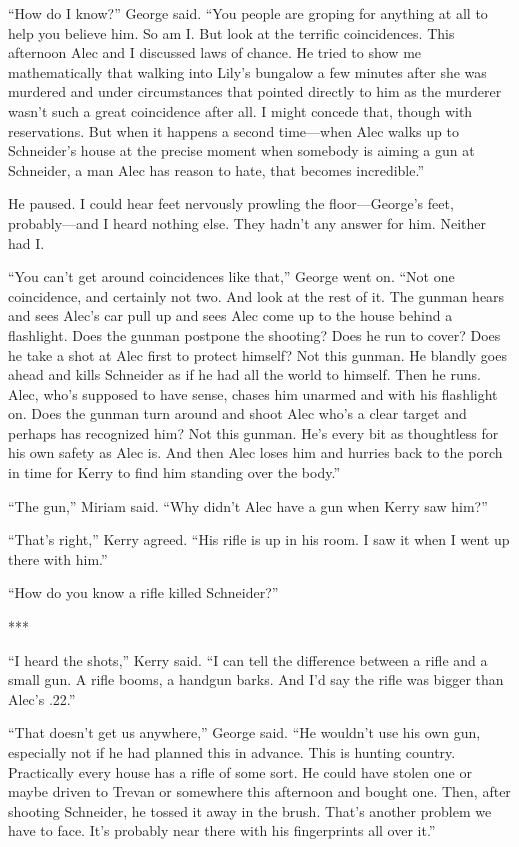 \documentclass{novel}
\begin{document}
“How do I know?” George said. “You people are groping for anything at all to help you believe him. So am I. But look at the terrific coincidences. This afternoon Alec and I discussed laws of chance. He tried to show me mathematically that walking into Lily’s bungalow a few minutes after she was murdered and under circumstances that pointed directly to him as the murderer wasn’t such a great coincidence after all. I might concede that, though with reservations. But when it happens a second time—when Alec walks up to Schneider’s house at the precise moment when somebody is aiming a gun at Schneider, a man Alec has reason to hate, that becomes incredible.”

He paused. I could hear feet nervously prowling the floor—George’s feet, probably—and I heard nothing else. They hadn’t any answer for him. Neither had I.

“You can’t get around coincidences like that,” George went on. “Not one coincidence, and certainly not two. And look at the rest of it. The gunman hears and sees Alec’s car pull up and sees Alec come up to the house behind a flashlight. Does the gunman postpone the shooting? Does he run to cover? Does he take a shot at Alec first to protect himself? Not this gunman. He blandly goes ahead and kills Schneider as if he had all the world to himself. Then he runs. Alec, who’s supposed to have sense, chases him unarmed and with his flashlight on. Does the gunman turn around and shoot Alec who’s a clear target and perhaps has recognized him? Not this gunman. He’s every bit as thoughtless for his own safety as Alec is. And then Alec loses him and hurries back to the porch in time for Kerry to find him standing over the body.”

“The gun,” Miriam said. “Why didn’t Alec have a gun when Kerry saw him?”

“That’s right,” Kerry agreed. “His rifle is up in his room. I saw it when I went up there with him.”

“How do you know a rifle killed Schneider?”

***

“I heard the shots,” Kerry said. “I can tell the difference between a rifle and a small gun. A rifle booms, a handgun barks. And I’d say the rifle was bigger than Alec’s .22.”

“That doesn’t get us anywhere,” George said. “He wouldn’t use his own gun, especially not if he had planned this in advance. This is hunting country. Practically every house has a rifle of some sort. He could have stolen one or maybe driven to Trevan or somewhere this afternoon and bought one. Then, after shooting Schneider, he tossed it away in the brush. That’s another problem we have to face. It’s probably near there with his fingerprints all over it.”
\end{document}
